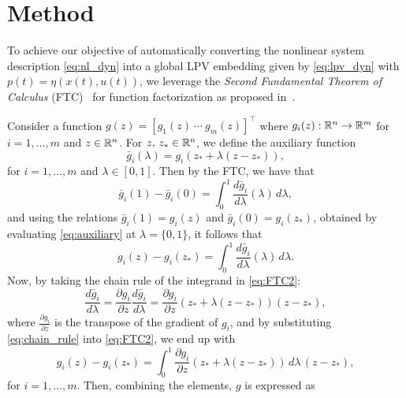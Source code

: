 \section{Method\label{sec:method}}
To achieve our objective of automatically converting the nonlinear system description \eqref{eq:nl_dyn} into a global LPV embedding given by \eqref{eq:lpv_dyn} with $p(t) = \eta(x(t), u(t))$, we leverage the \emph{Second Fundamental Theorem of Calculus} (FTC)~\citep{apostolCalculus1Onevariable1980} for function factorization as proposed in~\citep[Appendix~C.1]{koelewijnAnalysisControlNonlinear2023}.

Consider a function $g(z) = [g_1(z) \ \cdots \ g_m(z)]^\top$ where $g_i(z) : \mathbb{R}^{n} \rightarrow \mathbb{R}^{m}$ for $i = 1,\dots,m$ and $z \in \mathbb{R}^{n}$. For $z, \, z_{\ast} \in \mathbb{R}^\mathrm{n}$, we define the auxiliary function
%
\begin{equation}
	\label{eq:auxiliary}
	\bar{g}_i(\lambda) = g_i(z_{\ast} + \lambda(z - z_{\ast})),
\end{equation}
%
for $i = 1,\dots,m$ and $\lambda \in [0, 1]$. Then by the FTC, we have that
%
\begin{equation}
	\label{eq:FTC}
	\bar{g}_i(1) - \bar{g}_i(0) = \int_{0}^{1} \frac{d \bar{g}_i}{d \lambda}(\lambda) \, d \lambda,
\end{equation}
%
and using the relations $\bar{g}_i(1)=g_i(z)$ and $\bar{g}_i(0) =  g_i(z_{\ast})$, obtained by evaluating \eqref{eq:auxiliary} at $\lambda = \{0, 1\}$, it follows that
%
\begin{equation}
	\label{eq:FTC2}
	g_i(z) - g_i(z_{\ast}) = \int_{0}^{1} \frac{d \bar{g}_i}{d \lambda}(\lambda) \, d \lambda.
\end{equation}
%
Now, by taking the chain rule of the integrand in \eqref{eq:FTC2}:
%
\begin{equation}
	\label{eq:chain_rule}
	\frac{d \bar{g}_i}{d \lambda} = \frac{\partial g_i}{\partial z} \frac{d \bar{g}_i}{d \lambda} = \frac{\partial g_i}{\partial z}(z_{\ast} + \lambda(z - z_{\ast}))(z - z_{\ast}),
\end{equation}
%
where $\frac{\partial g_i}{\partial z}$ is the transpose of the gradient of $g_i$, and by substituting \eqref{eq:chain_rule} into \eqref{eq:FTC2}, we end up with
%
\begin{equation}
	g_i(z) - g_i(z_{\ast}) = \int_{0}^{1} \frac{\partial g_i}{\partial z}(z_{\ast} + \lambda(z - z_{\ast})) \, d \lambda \, (z - z_{\ast}),
\end{equation}
%
for $i = 1,\dots,m$. Then, combining the elements, $g$ is expressed as
